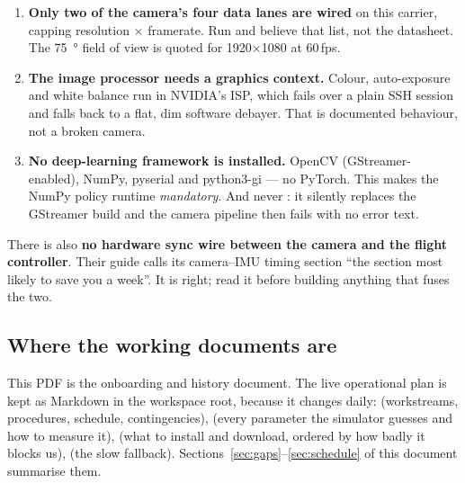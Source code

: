 \begin{warnbox}
\begin{enumerate}
\item \textbf{Only two of the camera's four data lanes are wired} on this carrier, capping resolution
$\times$ framerate. Run  and believe that list, not
the datasheet. The \SI{75}{\degree} field of view is quoted for 1920$\times$1080 at 60\,fps.
\item \textbf{The image processor needs a graphics context.} Colour, auto-exposure and white balance
run in NVIDIA's ISP, which fails over a plain SSH session and falls back to a flat, dim software
debayer. That is documented behaviour, not a broken camera.
\item \textbf{No deep-learning framework is installed.} OpenCV (GStreamer-enabled), NumPy, pyserial
and python3-gi --- no PyTorch. This makes the NumPy policy runtime \emph{mandatory}. And never
: it silently replaces the GStreamer build and the camera pipeline
then fails with no error text.
\end{enumerate}
There is also \textbf{no hardware sync wire between the camera and the flight controller}. Their
guide calls its camera--IMU timing section ``the section most likely to save you a week''. It is
right; read it before building anything that fuses the two.
\end{warnbox}

\subsection*{Where the working documents are}

This PDF is the onboarding and history document. The live operational plan is kept as Markdown in
the workspace root, because it changes daily:
 (workstreams, procedures, schedule, contingencies),
 (every parameter the simulator guesses and how to measure it),
 (what to install and download, ordered by how badly it blocks us),
 (the slow fallback).
Sections~\ref{sec:gaps}--\ref{sec:schedule} of this document summarise them.
